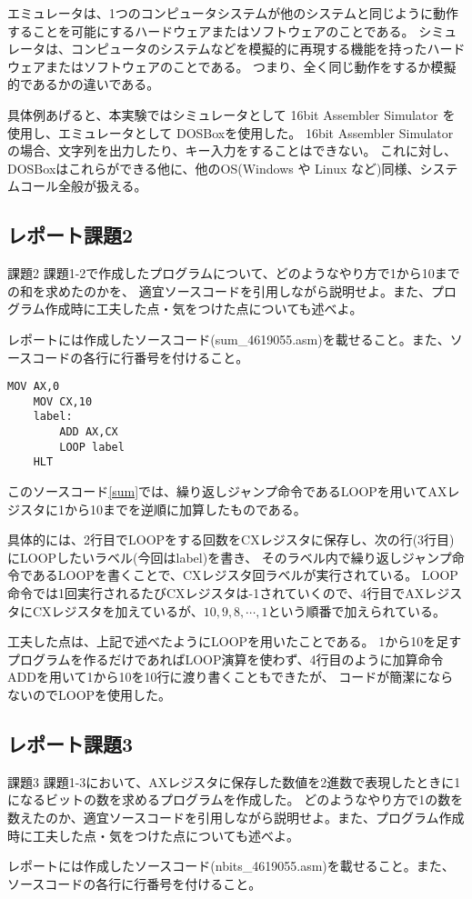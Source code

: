 \documentclass[12pt]{jarticle}
\begin{document}
エミュレータは、1つのコンピュータシステムが他のシステムと同じように動作することを可能にするハードウェアまたはソフトウェアのことである。
シミュレータは、コンピュータのシステムなどを模擬的に再現する機能を持ったハードウェアまたはソフトウェアのことである。
つまり、全く同じ動作をするか模擬的であるかの違いである。

具体例あげると、本実験ではシミュレータとして 16bit Assembler Simulator を使用し、エミュレータとして DOSBoxを使用した。
16bit Assembler Simulatorの場合、文字列を出力したり、キー入力をすることはできない。
これに対し、DOSBoxはこれらができる他に、他のOS(Windows や Linux など)同様、システムコール全般が扱える。

\subsection{レポート課題2}
\begin{itembox}[l]{課題2}
	課題1-2で作成したプログラムについて、どのようなやり方で1から10までの和を求めたのかを、
	適宜ソースコードを引用しながら説明せよ。また、プログラム作成時に工夫した点・気をつけた点についても述べよ。

	レポートには作成したソースコード(sum\_4619055.asm)を載せること。また、ソースコードの各行に行番号を付けること。
\end{itembox}
\begin{lstlisting}[caption=sum\_4619055.asm,label=sum]
	MOV AX,0
	MOV CX,10
	label:
		ADD AX,CX
		LOOP label
	HLT
\end{lstlisting}

このソースコード\ref{sum}では、繰り返しジャンプ命令であるLOOPを用いてAXレジスタに1から10までを逆順に加算したものである。

具体的には、2行目でLOOPをする回数をCXレジスタに保存し、次の行(3行目)にLOOPしたいラベル(今回はlabel)を書き、
そのラベル内で繰り返しジャンプ命令であるLOOPを書くことで、CXレジスタ回ラベルが実行されている。
LOOP命令では1回実行されるたびCXレジスタは-1されていくので、4行目でAXレジスタにCXレジスタを加えているが、$10,9,8,\cdots,1$という順番で加えられている。

工夫した点は、上記で述べたようにLOOPを用いたことである。
1から10を足すプログラムを作るだけであればLOOP演算を使わず、4行目のように加算命令ADDを用いて1から10を10行に渡り書くこともできたが、
コードが簡潔にならないのでLOOPを使用した。

\subsection{レポート課題3}
\begin{itembox}[l]{課題3}
	課題1-3において、AXレジスタに保存した数値を2進数で表現したときに1になるビットの数を求めるプログラムを作成した。
	どのようなやり方で1の数を数えたのか、適宜ソースコードを引用しながら説明せよ。また、プログラム作成時に工夫した点・気をつけた点についても述べよ。

	レポートには作成したソースコード(nbits\_4619055.asm)を載せること。また、ソースコードの各行に行番号を付けること。
\end{itembox}
\end{document}
